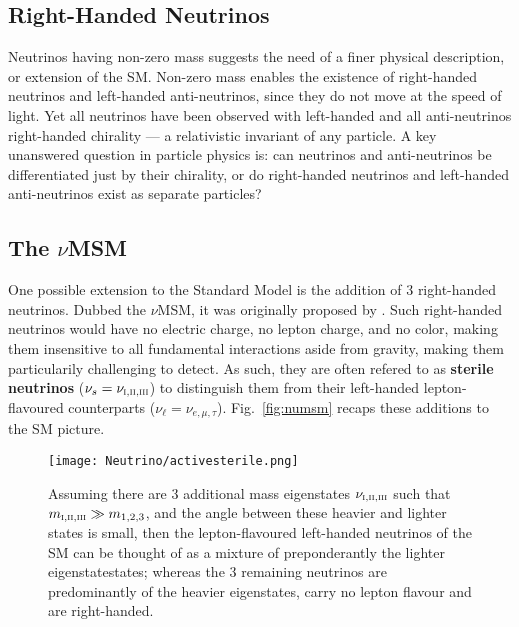 \subsection{Right-Handed Neutrinos}

Neutrinos having non-zero mass suggests the need of a finer physical description, or extension of the SM. Non-zero mass enables the existence of right-handed neutrinos and left-handed anti-neutrinos, since they do not move at the speed of light. Yet all neutrinos have been observed with left-handed and all anti-neutrinos right-handed chirality --- a relativistic invariant of any particle. A key unanswered question in particle physics is: can neutrinos and anti-neutrinos be differentiated just by their chirality, or do right-handed neutrinos and left-handed anti-neutrinos exist as separate particles? \\

\subsection{The $\nu$MSM}


One possible extension to the Standard Model is the addition of $3$ right-handed neutrinos. Dubbed the $\nu$MSM, it was originally proposed by \cite{nuMSM_1, nuMSM_2}. Such right-handed neutrinos would have no electric charge, no lepton charge, and no color, making them insensitive to all fundamental interactions aside from gravity, making them particularily challenging to detect. As such, they are often refered to as \textbf{sterile neutrinos} ($\nu_s = \nu_{\textsc{i}, \textsc{ii}, \textsc{iii}}$) to distinguish them from their left-handed lepton-flavoured counterparts ($\nu_\ell = \nu_{e, \mu, \tau}$). Fig.~\ref{fig:numsm} recaps these additions to the SM picture. \\

\begin{figure}[h]
\begin{center}
\texttt{[image: Neutrino/activesterile.png]}
\caption{Assuming there are $3$ additional mass eigenstates $\nu_{\textsc{i}, \textsc{ii}, \textsc{iii}}$ such that $m_{\textsc{i}, \textsc{ii}, \textsc{iii}} \gg m_{1,2,3}$, and the angle between these heavier and lighter states is small, then the lepton-flavoured left-handed neutrinos of the SM can be thought of as a mixture of preponderantly the lighter eigenstatestates; whereas the $3$ remaining neutrinos are predominantly of the heavier eigenstates, carry no lepton flavour and are right-handed.}
\label{fig:actster}
\end{center}
\end{figure}


